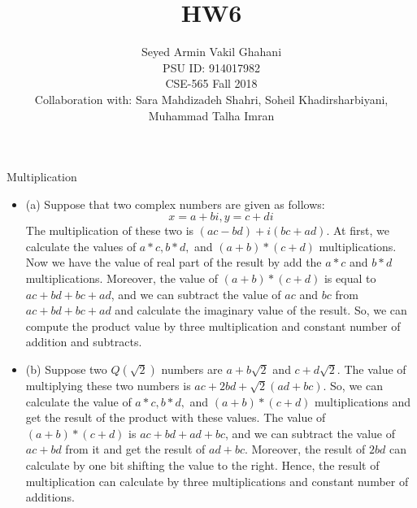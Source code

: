 \documentclass[12pt]{article}
\newenvironment{solution}[2][Solution]{\begin{trivlist}
\item[\hskip \labelsep {\bfseries #1}]}{\end{trivlist}}
\newenvironment{problem}[2][Problem]{\begin{trivlist}
\item[\hskip \labelsep {\bfseries #1}\hskip \labelsep {\bfseries #2.}]}{\end{trivlist}}
\begin{document}
 
\title{\textbf{HW6}}%
\author{Seyed Armin Vakil Ghahani\\ %
PSU ID: 914017982\\
CSE-565 Fall 2018\\
Collaboration with:
Sara Mahdizadeh Shahri, Soheil Khadirsharbiyani,\\
Muhammad Talha Imran} %
 
\maketitle
\begin{problem}{1}
Multiplication
\end{problem}

\begin{solution}{}
\begin{itemize}
\item (a) Suppose that two complex numbers are given as follows:
$$ x = a+bi, y = c+di$$
The multiplication of these two is $(ac-bd)+i(bc+ad)$. At first, we calculate the
values of $a*c, b*d, $ and $(a+b)*(c+d)$ multiplications. Now we have the value of
real part of the result by add the $a*c$ and $b*d$ multiplications. Moreover,
the value of $(a+b)*(c+d)$ is equal to $ac+bd+bc+ad$, and we can subtract the value
of $ac$ and $bc$ from $ac+bd+bc+ad$ and calculate the imaginary value of the result.
So, we can compute the product value by three multiplication and constant number of 
addition and subtracts.

\item (b) Suppose two $Q(\sqrt{2})$ numbers are $a+b\sqrt{2}$ and $c+d\sqrt{2}$.
The value of multiplying these two numbers is $ac+2bd+\sqrt{2}(ad+bc)$. So, we can
calculate the value of $a*c, b*d,$ and $(a+b)*(c+d)$ multiplications and get the 
result of the product with these values. The value of $(a+b)*(c+d)$ is $ac+bd+ad+bc$,
and we can subtract the value of $ac + bd$ from it and get the result of $ad+bc$.
Moreover, the result of $2bd$ can calculate by one bit shifting the value to the right.
Hence, the result of multiplication can calculate by three multiplications and constant
number of additions.
\end{itemize}
\end{solution}
\end{document}

